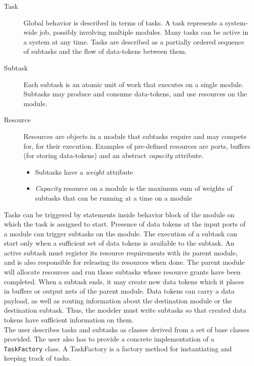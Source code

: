 \documentclass[12pt,a4paper]{report}
\begin{document}
	\begin{description}
	\item[Task] Global behavior is described in terms of tasks. A task
	represents a system-wide job, possibly involving multiple modules.
	Many tasks can be active in a system at any time. Tasks are described as 
	a partially ordered sequence of subtasks and the flow of data-tokens between them.

	\item[Subtask] Each subtask is an atomic unit of work that executes on a single
	module. Subtasks may produce and consume data-tokens, and use resources on the module.

	\item[Resource] Resources are objects in a module that subtasks require and may compete for,
	for their execution. Examples of pre-defined resources are ports, buffers (for storing data-tokens)
	and an abstract \emph{capacity} attribute.
	\begin{itemize}
		\item Subtasks have a \emph{weight} attribute
		\item \emph{Capacity} resource on a module is the maximum sum of weights
		of subtasks that can be running at a time on a module
	\end{itemize}
	\end{description}

	Tasks can be triggered by statements inside behavior block of the
	module on which the task is assigned to start. Presence of data tokens
	at the input ports of a module can trigger subtasks on the module.  The
	execution of a subtask can start only when a sufficient set of data
	tokens is available to the subtask.  An active subtask must register
	its resource requirements with its parent module, and is also
	responsible for releasing its resources when done.  The parent module
	will allocate resources and run those subtasks whose resource grants
	have been completed.  When a subtask ends, it may create new data
	tokens which it places in buffers or output nets of the parent module.
	Data tokens can carry a data payload, as well as routing information
	about the destination module or the destination subtask.  Thus, the
	modeler must write subtasks so that created data tokens have sufficient
	information on them.\\

	

	The user describes tasks and subtasks as classes derived from a set of
	base classes provided. The user also has to provide a concrete
	implementation of a \texttt{TaskFactory} class.  A TaskFactory is a
	factory method for instantiating and keeping track of tasks.\\
\end{document}
